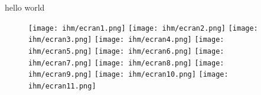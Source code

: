 \documentclass[a4paper,11pt,titlepage,french]{article}
\begin{document}
\sloppy %
\renewcommand{\arraystretch}{1.3} %

hello world

\begin{figure}  
    \centering  
    \texttt{[image: ihm/ecran1.png]}  
    \texttt{[image: ihm/ecran2.png]}  
    \texttt{[image: ihm/ecran3.png]}  
    \texttt{[image: ihm/ecran4.png]}  
    \texttt{[image: ihm/ecran5.png]}  
    \texttt{[image: ihm/ecran6.png]}
    \texttt{[image: ihm/ecran7.png]}  
    \texttt{[image: ihm/ecran8.png]}  
    \texttt{[image: ihm/ecran9.png]}  
    \texttt{[image: ihm/ecran10.png]}  
    \texttt{[image: ihm/ecran11.png]}  

\end{figure} 

\end{document}
